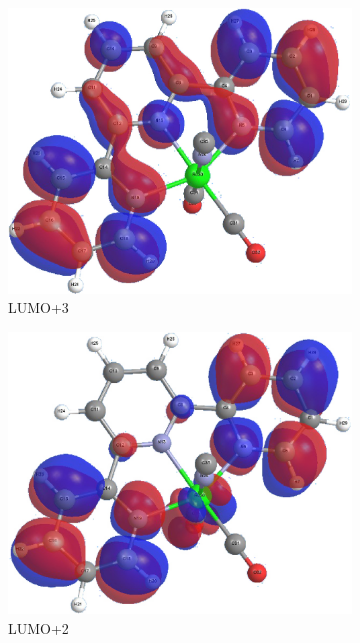 \begin{figure}[!ht]
 \centering
 \begin{subfigure}[b]{0.31\textwidth}
  \includegraphics[clip=true, width=\textwidth, keepaspectratio]{images/mos/6l+3.eps}
  \caption{LUMO+3}
 \end{subfigure}
 \begin{subfigure}[b]{0.31\textwidth}
  \includegraphics[clip=true, width=\textwidth, keepaspectratio]{images/mos/6l+2.eps}
  \caption{LUMO+2}
 \end{subfigure}
  \begin{subfigure}[b]{0.31\textwidth}

\end{subfigure}
\end{figure}
